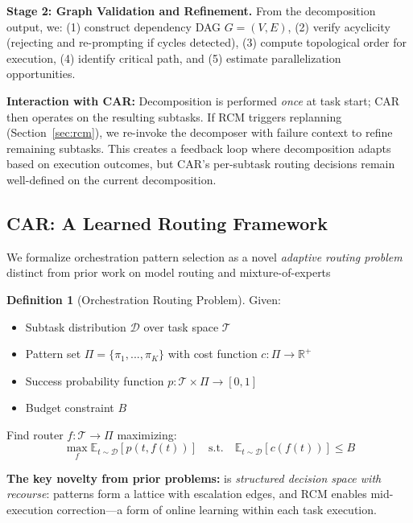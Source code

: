 \documentclass{article}
\theoremstyle{plain}
\theoremstyle{definition}
\newtheorem{definition}[theorem]{Definition}
\theoremstyle{remark}
\begin{document}
\textbf{Stage 2: Graph Validation and Refinement.}
From the decomposition output, we: (1) construct dependency DAG $G = (V, E)$, (2) verify acyclicity (rejecting and re-prompting if cycles detected), (3) compute topological order for execution, (4) identify critical path, and (5) estimate parallelization opportunities.

\textbf{Interaction with CAR:} Decomposition is performed \emph{once} at task start; CAR then operates on the resulting subtasks. If RCM triggers replanning (Section~\ref{sec:rcm}), we re-invoke the decomposer with failure context to refine remaining subtasks. This creates a feedback loop where decomposition adapts based on execution outcomes, but CAR's per-subtask routing decisions remain well-defined on the current decomposition.

%

\subsection{CAR: A Learned Routing Framework}

We formalize orchestration pattern selection as a novel
\emph{adaptive routing problem} distinct from prior work
on model routing and mixture-of-experts 

\begin{definition}[Orchestration Routing Problem]
	Given:
	\begin{itemize}
		\item Subtask distribution $\mathcal{D}$ over task space $\mathcal{T}$
		\item Pattern set $\Pi = \{\pi_1, ..., \pi_K\}$ with cost function
		$c: \Pi \to \mathbb{R}^+$
		\item Success probability function $p: \mathcal{T} \times \Pi \to [0,1]$
		\item Budget constraint $B$
	\end{itemize}
	Find router $f: \mathcal{T} \to \Pi$ maximizing:
	\[
	\max_f \mathbb{E}_{t \sim \mathcal{D}}[p(t, f(t))] \quad
	\text{s.t.} \quad \mathbb{E}_{t \sim \mathcal{D}}[c(f(t))] \leq B
	\]
\end{definition}

\textbf{The key novelty from prior problems:} is \emph{structured decision space with recourse}:
patterns form a lattice with escalation edges, and RCM enables
mid-execution correction—a form of online learning within
each task execution.
\end{document}

